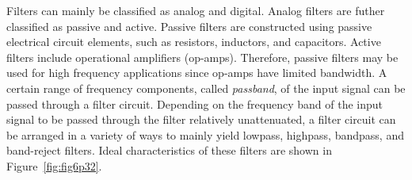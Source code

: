 %
Filters can mainly be classified as analog and digital. Analog filters are
futher classified as passive and active. Passive filters are constructed using
passive electrical circuit elements, such as resistors, inductors, and
capacitors. Active filters include operational amplifiers (op-amps). Therefore,
passive filters may be used for high frequency applications since op-amps have
limited bandwidth. A certain range of frequency components, called
\emph{passband}, of the input signal can be passed through a filter circuit.
Depending on the frequency band of the input signal to be passed through the
filter relatively unattenuated, a filter circuit can be arranged in a variety of
ways to mainly yield lowpass, highpass, bandpass, and band-reject filters. Ideal
characteristics of these filters are shown in Figure~\ref{fig:fig6p32}. %
%
  \begin{figure}
    \centering
\end{figure}
